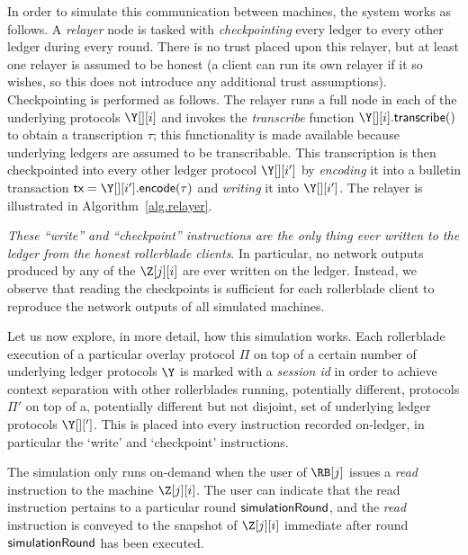 In order to simulate this communication between machines, the system works as follows.
A \emph{relayer} node is tasked with \emph{checkpointing} every ledger to every other ledger
during every round. There is no trust placed upon this relayer, but at least one relayer
is assumed to be honest (a client can run its own relayer if it so wishes, so this does
not introduce any additional trust assumptions). Checkpointing is performed as follows.
The relayer runs a full node in each of the underlying protocols $\Y[][i]$ and
invokes the \emph{transcribe} function $\Y[][i].\transcribe()$ to obtain a transcription
$\tau$; this functionality is made available because underlying ledgers are assumed to be
transcribable. This transcription is then checkpointed into every other ledger protocol
$\Y[][i']$ by \emph{encoding} it into a bulletin transaction $\tx = \Y[][i'].\encode(\tau)$
and \emph{writing} it into $\Y[][i']$. The relayer is illustrated in
Algorithm~\ref{alg.relayer}.

\emph{These ``write'' and ``checkpoint'' instructions are the only thing ever written
to the ledger from the honest rollerblade clients}. In particular, no network outputs
produced by any of the $\Z[j][i]$ are ever written on the ledger. Instead, we observe
that reading the checkpoints is sufficient for each rollerblade client to reproduce
the network outputs of all simulated machines.

Let us now explore, in more detail, how this simulation works. Each rollerblade execution
of a particular overlay protocol $\Pi$ on top of a certain number of underlying ledger
protocols $\Y$ is marked with a \emph{session id} \sid in order to achieve context
separation with other rollerblades running, potentially different, protocols $\Pi'$
on top of a, potentially different but not disjoint, set of underlying ledger protocols
$\Y[][']$. This \sid is placed into every instruction recorded on-ledger, in particular
the `write' and `checkpoint' instructions.

The simulation only runs
on-demand when the user of $\RB[j]$ issues a \emph{read} instruction to the machine
$\Z[j][i]$. The user can indicate that the read instruction pertains to a particular
round $\textsf{simulationRound}$, and the \emph{read} instruction is conveyed to the snapshot
of $\Z[j][i]$ immediate after round $\textsf{simulationRound}$ has been executed.


